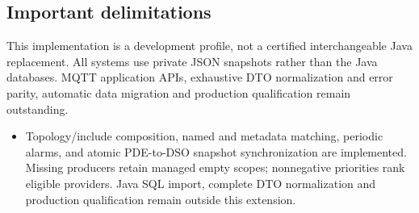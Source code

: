 \documentclass[a4paper]{arrowhead}
\begin{document}
\subsection{Important delimitations}
This implementation is a development profile, not a certified interchangeable Java replacement. All systems use private JSON snapshots rather than the Java databases. MQTT application APIs, exhaustive DTO normalization and error parity, automatic data migration and production qualification remain outstanding.
\begin{itemize}
\item Topology/include composition, named and metadata matching, periodic alarms, and atomic PDE-to-DSO snapshot synchronization are implemented. Missing producers retain managed empty scopes; nonnegative priorities rank eligible providers. Java SQL import, complete DTO normalization and production qualification remain outside this extension.
\end{itemize}
\end{document}
